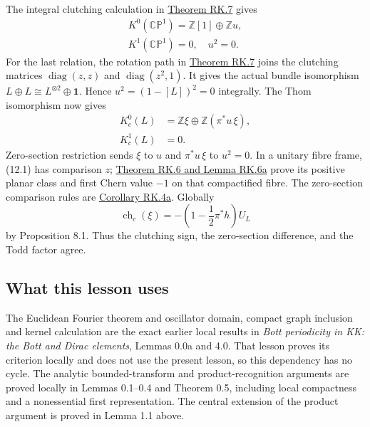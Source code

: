 \documentclass[
  11pt,
]{article}
\begin{document}
The integral clutching calculation in
\href{supporting/relative-k-foundations/relative-k-foundations.html\#rk-sphere-ring}{Theorem
RK.7} gives \[
\begin{gathered}
K^0(\mathbb{CP}^1)=\mathbb Z[1]\oplus\mathbb Z u,\\
K^1(\mathbb{CP}^1)=0,\quad u^2=0.
\end{gathered}
\tag{12.2}
\] For the last relation, the rotation path in
\href{supporting/relative-k-foundations/relative-k-foundations.html\#rk-sphere-ring}{Theorem
RK.7} joins the clutching matrices \(\operatorname{diag}(z,z)\) and
\(\operatorname{diag}(z^2,1)\). It gives the actual bundle isomorphism
\(L\oplus L\cong L^{\otimes2}\oplus\mathbf1\). Hence \(u^2=(1-[L])^2=0\)
integrally. The Thom isomorphism now gives \[
\begin{aligned}
K_c^0(L)&=\mathbb Z\xi\oplus\mathbb Z(\pi^*u\,\xi),\\
K_c^1(L)&=0.
\end{aligned}
\tag{12.3}
\] Zero-section restriction sends \(\xi\) to \(u\) and \(\pi^*u\,\xi\)
to \(u^2=0\). In a unitary fibre frame, (12.1) has comparison \(z\);
\href{supporting/relative-k-foundations/relative-k-foundations.html\#rk-planar-bott}{Theorem
RK.6 and Lemma RK.6a} prove its positive planar class and first Chern
value \(-1\) on that compactified fibre. The zero-section comparison
rules are
\href{supporting/relative-k-foundations/relative-k-foundations.html\#rk-symbol-rules}{Corollary
RK.4a}. Globally \[
\operatorname{ch}_c(\xi)
 =-\left(1-\frac12\pi^*h\right)U_L
\tag{12.4}
\] by Proposition 8.1. Thus the clutching sign, the zero-section
difference, and the Todd factor agree.

\subsection{What this lesson uses}\label{what-this-lesson-uses}

The Euclidean Fourier theorem and oscillator domain, compact graph
inclusion and kernel calculation are the exact earlier local results in
\emph{Bott periodicity in KK: the Bott and Dirac elements}, Lemmas 0.0a
and 4.0. That lesson proves its criterion locally and does not use the
present lesson, so this dependency has no cycle. The analytic
bounded-transform and product-recognition arguments are proved locally
in Lemmas 0.1--0.4 and Theorem 0.5, including local compactness and a
nonessential first representation. The central extension of the product
argument is proved in Lemma 1.1 above.
\end{document}
